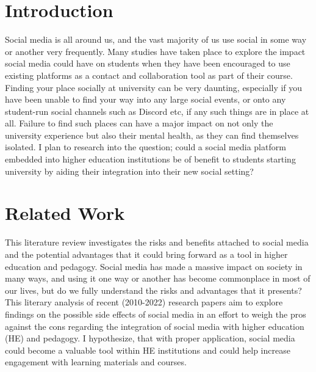 \documentclass[lettersize,journal]{IEEEtran}
\begin{document}
\section{Introduction}
	Social media is all around us, and the vast majority of us use social in some way or another very
	frequently. Many studies have taken place to explore the impact social media could have on students
	when they have been encouraged to use existing platforms as a contact and collaboration tool as part
	of their course. 
    Finding your place socially at university can be very daunting, especially if you have been unable to find
    your way into any large social events, or onto any student-run social channels such as Discord etc, if any
    such things are in place at all. Failure to find such places can have a major impact on not only the university
    experience but also their mental health, as they can find themselves isolated. I plan to research into the
    question; could a social media platform embedded into higher education institutions be of benefit to students
    starting university by aiding their integration into their new social setting?

\section{Related Work}
    This literature review investigates the risks and benefits attached to
    social media and the potential advantages that it could bring forward as a
    tool in higher education and pedagogy. Social media has made a massive
    impact on society in many ways, and using it one way or another has become
    commonplace in most of our lives, but do we fully understand the risks and
    advantages that it presents? This literary analysis of recent (2010-2022)
    research papers aim to explore findings on the possible side effects of
    social media in an effort to weigh the pros against the cons regarding
    the integration of social media with higher education (HE) and pedagogy. I
    hypothesize, that with proper application, social media could become a valuable
    tool within HE institutions and could help increase engagement with learning
    materials and courses.
\end{document}
